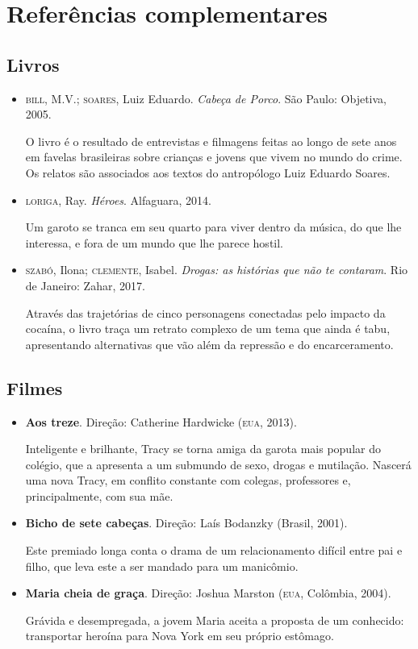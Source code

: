 \documentclass[11pt]{extarticle}
\begin{document}
\section{Referências complementares}

\subsection{Livros}

\begin{itemize}
\item\textsc{bill}, M.V.; \textsc{soares}, Luiz Eduardo. \textit{Cabeça de Porco}. São Paulo: Objetiva, 2005.

O livro é o resultado de entrevistas e filmagens feitas ao longo de sete
anos em favelas brasileiras sobre crianças e jovens que vivem no mundo
do crime. Os relatos são associados aos textos do antropólogo Luiz
Eduardo Soares.

\item\textsc{loriga}, Ray. \textit{Héroes}. Alfaguara, 2014.

Um garoto se tranca em seu quarto para viver dentro da música, do que
lhe interessa, e fora de um mundo que lhe parece hostil.

\item\textsc{szabó}, Ilona; \textsc{clemente}, Isabel. \textit{Drogas: as histórias que não te contaram}. Rio de Janeiro: Zahar, 2017.

Através das trajetórias de cinco personagens conectadas pelo impacto da
cocaína, o livro traça um retrato complexo de um tema que ainda é tabu,
apresentando alternativas que vão além da repressão e do encarceramento.
\end{itemize}

\subsection{Filmes}

\begin{itemize}
\item\textbf{Aos treze}. Direção: Catherine Hardwicke (\textsc{eua}, 2013).

Inteligente e brilhante, Tracy se torna amiga da garota mais popular do
colégio, que a apresenta a um submundo de sexo, drogas e mutilação.
Nascerá uma nova Tracy, em conflito constante com colegas, professores
e, principalmente, com sua mãe.

\item\textbf{Bicho de sete cabeças}. Direção: Laís Bodanzky (Brasil, 2001).

Este premiado longa conta o drama de um relacionamento difícil entre pai
e filho, que leva este a ser mandado para um manicômio.

\item\textbf{Maria cheia de graça}. Direção: Joshua Marston (\textsc{eua}, Colômbia, 2004).

Grávida e desempregada, a jovem Maria aceita a proposta de um conhecido:
transportar heroína para Nova York em seu próprio estômago.
\end{itemize}
\end{document}
